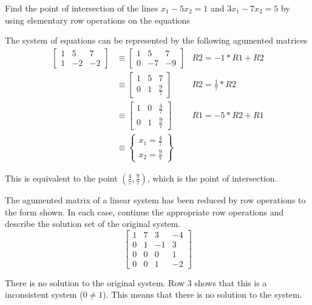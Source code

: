 \documentclass{../mathhomework}
\begin{document}
\begin{problem}[1.1\#3]
    Find the point of intersection of the lines $x_1 - 5x_2 = 1$ and $3x_1 - 7x_2 = 5$ by using elementary row operations on the equations

    \begin{solution}
        The system of equations can be represented by the following agumented matrices
        \begin{align*}
            \begin{bmatrix}
                1 & 5 & 7 \\
                1 & -2 & -2
            \end{bmatrix}
            & \equiv
            \begin{bmatrix}
                1 & 5 & 7 \\
                0 & -7 & -9
            \end{bmatrix}
            & R2 = -1 * R1 + R2 \\ & \equiv
            \begin{bmatrix}
                1 & 5 & 7 \\
                0 & 1 & \frac{9}{7} 
            \end{bmatrix}
            & R2 = \frac{1}{7} * R2 \\ & \equiv
            \begin{bmatrix}
                1 & 0 & \frac{4}{7} \\
                0 & 1 & \frac{9}{7} 
            \end{bmatrix}
            & R1 = -5 * R2 + R1 \\ & \equiv
            \begin{Bmatrix}
                x_1 = \frac{4}{7} \\
                x_2 = \frac{9}{7}
            \end{Bmatrix}
        \end{align*}

        This is equivalent to the point $(\frac{4}{7}, \frac{9}{7})$, which is the point of intersection.
    \end{solution}
\end{problem}

\pagebreak
\begin{problem}[1.1\#7]
    The agumented matrix of a linear system has been reduced by row operations to the form shown.
    In each case, continue the appropriate row operations and describe the solution set of the original system.
    $$\begin{bmatrix}
        1 & 7 & 3 & -4 \\
        0 & 1 & -1 & 3 \\
        0 & 0 & 0 & 1 \\
        0 & 0 & 1 & -2
    \end{bmatrix}$$

    \begin{solution}
        There is no solution to the original system. Row 3 shows that this is a inconsistent system ($0 \neq 1$).
        This means that there is no solution to the system.
    \end{solution}
\end{problem}
\end{document}
